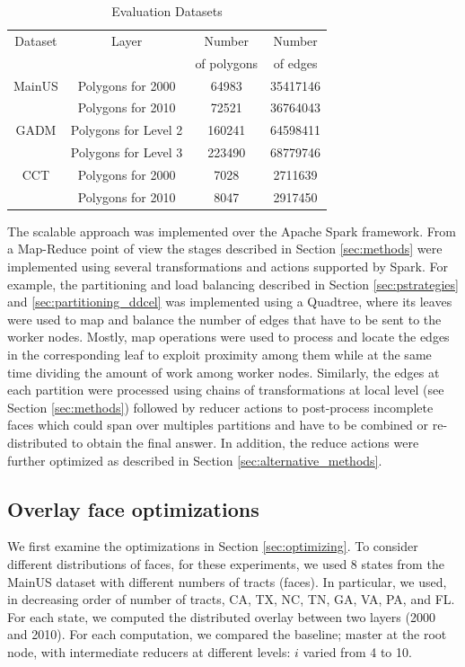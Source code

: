 \begin{table}
    \small
    \caption{Evaluation Datasets}
    \label{tab:datasets}
    \begin{tabular}{c c c c}
        \toprule
        Dataset & Layer & Number        & Number    \\
                &       & of polygons   & of edges  \\
        \midrule
        MainUS& Polygons for 2000 & 64983 & 35417146        \\
              & Polygons for 2010 & 72521 & 36764043        \\
        GADM  & Polygons for Level 2 & 160241 & 64598411    \\
              & Polygons for Level 3 & 223490 & 68779746    \\
        CCT   & Polygons for 2000 & 7028 & 2711639          \\
              & Polygons for 2010 & 8047 & 2917450          \\
        \bottomrule
    \end{tabular}
\end{table}

The scalable approach was implemented over the Apache Spark framework.  From a Map-Reduce point of view the stages described in Section  \ref{sec:methods} were implemented using several transformations and actions supported by Spark.  For example, the partitioning and load balancing described in Section \ref{sec:pstrategies} and \ref{sec:partitioning_ddcel} was implemented using a Quadtree, where its leaves were used to map and balance the number of edges that have to be sent to the worker nodes.  Mostly, map operations were used to process and locate the edges in the corresponding leaf to exploit proximity among them while at the same time dividing the amount of work among worker nodes.
Similarly, the edges at each partition were processed using chains of transformations at local level (see Section \ref{sec:methods}) followed by reducer actions to post-process incomplete faces which could span over multiples partitions and have to be combined or re-distributed to obtain the final answer.  In addition, the reduce actions were further optimized as described in Section \ref{sec:alternative_methods}.

\subsection{Overlay face optimizations}\label{sec:overlay_optimization}
We first examine the optimizations in Section \ref{sec:optimizing}. To consider different distributions of faces, for these experiments, we used 8 states from the MainUS dataset with different numbers of tracts (faces). In particular, we used, in decreasing order of number of tracts, CA, TX, NC, TN, GA, VA, PA, and FL. For each state, we computed the distributed overlay between two layers (2000 and 2010). For each computation, we compared the baseline; master at the root node, with intermediate reducers at different levels: $i$ varied from 4 to 10. 

